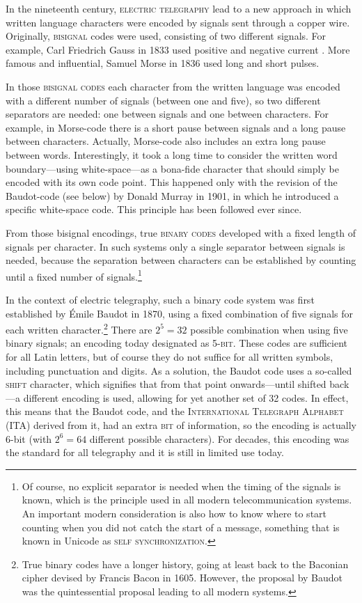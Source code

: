 In the nineteenth century, \textsc{electric telegraphy} lead to a new approach in which written language characters were encoded by signals sent through a copper wire. Originally, \textsc{bisignal} codes were used, consisting of two different signals. For example, Carl Friedrich Gauss in 1833 used positive and negative current \citep[282]{Mania2008}. More famous and influential, Samuel Morse in 1836 used long and short pulses. 

In those \textsc{bisignal codes} each character from the written language was encoded with a different number of signals (between one and five), so two different separators are needed: one between signals and one between characters. For example, in Morse-code there is a short pause between signals and a long pause between characters. Actually, Morse-code also includes an extra long pause between words. Interestingly, it took a long time to consider the written word boundary---using white-space---as a bona-fide character that should simply be encoded with its own code point. This happened only with the revision of the Baudot-code (see below) by Donald Murray in 1901, in which he introduced a specific white-space code. This principle has been followed ever since.

From those bisignal encodings, true \textsc{binary codes} developed with a fixed length of signals per character. In such systems only a single separator between signals is needed, because the separation between characters can be established by counting until a fixed number of signals.\footnote{Of course, no explicit separator is needed when the timing of the signals is known, which is the principle used in all modern telecommunication systems. An important modern consideration is also how to know where to start counting when you did not catch the start of a message, something that is known in Unicode as \textsc{self synchronization}.} 

In the context of electric telegraphy, such a binary code system was first established by Émile Baudot in 1870, using a fixed combination of five signals for each written character.\footnote{True binary codes have a longer history, going at least back to the Baconian cipher devised by Francis Bacon in 1605. However, the proposal by Baudot was the quintessential proposal leading to all modern systems.} There are $2^5 = 32$ possible combination when using five binary signals; an encoding today designated as \textsc{5-bit}. These codes are sufficient for all Latin letters, but of course they do not suffice for all written symbols, including punctuation and digits. As a solution, the Baudot code uses a so-called \textsc{shift} character, which signifies that from that point onwards---until shifted back---a different encoding is used, allowing for yet another set of 32 codes. In effect, this means that the Baudot code, and the \textsc{International Telegraph Alphabet} (ITA) derived from it, had an extra \textsc{bit} of information, so the encoding is actually 6-bit (with $2^6 = 64$ different possible characters). For decades, this encoding was the standard for all telegraphy and it is still in limited use today.

